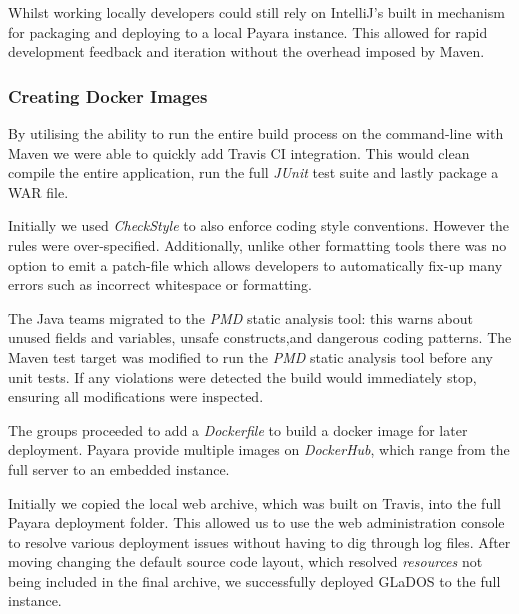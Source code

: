         \par
        Whilst working locally developers could still rely on IntelliJ's built in mechanism for packaging and deploying to a local Payara instance. This allowed for rapid development feedback and iteration without the overhead imposed by Maven.

        \subsubsection{Creating Docker Images}
        \par
        By utilising the ability to run the entire build process on the command-line with Maven we were able to quickly add Travis CI integration. This would clean compile the entire application, run the full \textit{JUnit} test suite and lastly package a WAR file.

        \par
        Initially we used \textit{CheckStyle} to also enforce coding style conventions. However the rules were over-specified. Additionally, unlike other formatting tools there was no option to emit a patch-file which allows developers to automatically fix-up many errors such as incorrect whitespace or formatting.

        \par
        The Java teams migrated to the \textit{PMD}\cite{PMD} static analysis tool: this warns about unused fields and variables, unsafe constructs,and dangerous coding patterns.
        The Maven test target was modified to run the \textit{PMD}\cite{PMD} static analysis tool before any unit tests. If any violations were detected the build would immediately stop, ensuring all modifications were inspected.

        \par
        The groups proceeded to add a \textit{Dockerfile} to build a docker image for later deployment. Payara provide multiple images on \textit{DockerHub}\cite{DockerHub_Payara}, which range from the full server to an embedded instance.

        \par
        Initially we copied the local web archive, which was built on Travis, into the full Payara deployment folder. This allowed us to use the web administration console to resolve various deployment issues without having to dig through log files. After moving changing the default source code layout, which resolved \textit{resources} not being included in the final archive, we successfully deployed GLaDOS to the full instance.

